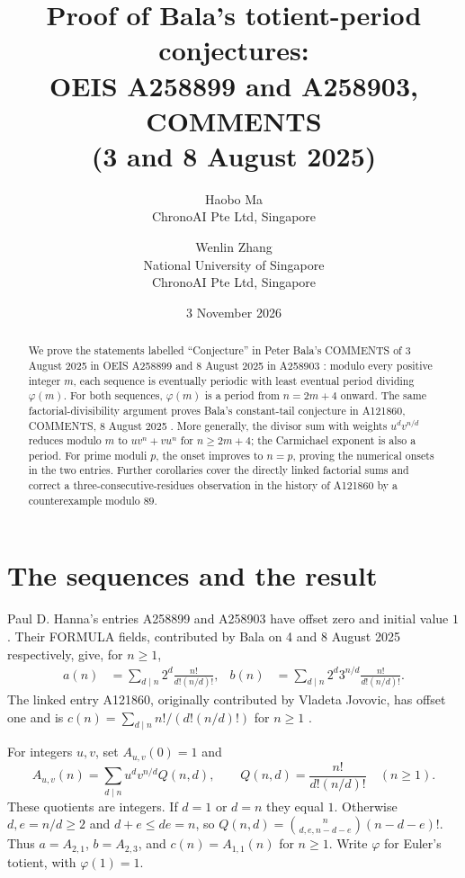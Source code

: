 \documentclass[11pt]{article}
\title{Proof of Bala's totient-period conjectures:\\
OEIS A258899 and A258903, COMMENTS\\
(3 and 8 August 2025)}
\author{Haobo Ma\\\small ChronoAI Pte Ltd, Singapore
\and Wenlin Zhang\\\small National University of Singapore\\\small ChronoAI Pte Ltd, Singapore}
\date{3 November 2026}
\newcommand{\A}{A_{u,v}}
\begin{document}
\maketitle
\begin{abstract}
We prove the statements labelled ``Conjecture'' in Peter Bala's COMMENTS
of 3 August 2025 in OEIS A258899 and 8 August 2025 in A258903
\cite{a258899,a258903}: modulo every positive integer $m$, each sequence
is eventually periodic with least eventual period dividing $\varphi(m)$.
For both sequences, $\varphi(m)$ is a period from $n=2m+4$ onward.
The same factorial-divisibility argument proves Bala's constant-tail
conjecture in A121860, COMMENTS, 8 August 2025 \cite{a121860}.
More generally, the divisor sum with weights $u^d v^{n/d}$ reduces modulo
$m$ to $uv^n+vu^n$ for $n\geq2m+4$; the Carmichael exponent is also a period.
For prime moduli $p$, the onset improves to $n=p$, proving the numerical
onsets in the two entries. Further corollaries cover the directly linked
factorial sums and correct a three-consecutive-residues observation
in the history of A121860 by a counterexample modulo $89$.
\end{abstract}

\section{The sequences and the result}
Paul D. Hanna's entries A258899 and A258903 have offset zero and initial
value $1$ \cite{a258899,a258903}. Their FORMULA fields, contributed by
Bala on 4 and 8 August 2025 respectively, give, for $n\geq1$,
\begin{align*}
 a(n)&=\sum_{d\mid n}2^d\frac{n!}{d!(n/d)!},&
 b(n)&=\sum_{d\mid n}2^d3^{n/d}\frac{n!}{d!(n/d)!}.
\end{align*}
The linked entry A121860, originally contributed by Vladeta Jovovic,
has offset one and is
$c(n)=\sum_{d\mid n} n!/(d!(n/d)!)$ for $n\geq1$ \cite{a121860}.

For integers $u,v$, set $\A(0)=1$ and
\begin{equation}\label{eq:def}
 \A(n)=\sum_{d\mid n}u^dv^{n/d}Q(n,d),\qquad
 Q(n,d)=\frac{n!}{d!(n/d)!}\quad(n\geq1).
\end{equation}
These quotients are integers. If $d=1$ or $d=n$ they equal $1$.
Otherwise $d,e=n/d\geq2$ and $d+e\leq de=n$, so
$Q(n,d)=\binom{n}{d,e,n-d-e}(n-d-e)!$.
Thus $a=A_{2,1}$, $b=A_{2,3}$, and $c(n)=A_{1,1}(n)$ for $n\geq1$.
Write $\varphi$ for Euler's totient, with $\varphi(1)=1$.
\end{document}
